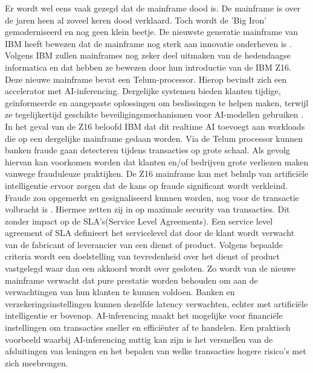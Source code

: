 Er wordt wel eens vaak gezegd dat de mainframe dood is. De mainframe is over de jaren heen al zoveel keren dood verklaard. Toch wordt de 'Big Iron' gemoderniseerd en nog geen klein beetje. De nieuwste generatie mainframe van IBM heeft bewezen dat de mainframe nog sterk aan innovatie onderheven is \autocite{Almekinders2022}. Volgens IBM zullen mainframes nog zeker deel uitmaken van de hedendaagse informatica en dat hebben ze bewezen door hun introductie van de IBM Z16. Deze nieuwe mainframe bevat een Telum-processor. Hierop bevindt zich een accelerator met AI-inferencing. Dergelijke systemen bieden klanten tijdige, geïnformeerde en aangepaste oplossingen om beslissingen te helpen maken, terwijl ze tegelijkertijd geschikte beveiligingsmechanismen voor AI-modellen gebruiken \autocite{Cammarota2020}. In het geval van de Z16 beloofd IBM dat dit realtime AI toevoegt aan workloads die op een dergelijke mainframe gedaan worden. Via de Telum processor kunnen banken fraude gaan detecteren tijdens transacties op grote schaal. Als gevolg hiervan kan voorkomen worden dat klanten en/of bedrijven grote verliezen maken vanwege frauduleuze praktijken. De Z16 mainframe kan met behulp van artificiële intelligentie ervoor zorgen dat de kans op fraude significant wordt verkleind. Fraude zou opgemerkt en gesignaliseerd kunnen worden, nog voor de transactie volbracht is \autocite{Saran2022}. Hiermee zetten zij in op maximale security van transacties. Dit zonder impact op de SLA's(Service Level Agreements). Een service level agreement of SLA definieert het servicelevel dat door de klant wordt verwacht van de fabricant of leverancier van een dienst of product. Volgens bepaalde criteria wordt een doelstelling van tevredenheid over het dienst of product vastgelegd waar dan een akkoord wordt over gesloten. Zo wordt van de nieuwe mainframe verwacht dat pure prestatie worden behouden om aan de verwachtingen van hun klanten te kunnen voldoen. Banken en verzekeringsinstellingen kunnen dezelfde latency verwachten, echter met artificiële intelligentie er bovenop. AI-inferencing maakt het mogelijke voor financiële instellingen om transacties sneller en efficiënter af te handelen. Een praktisch voorbeeld waarbij AI-inferencing nuttig kan zijn is het versnellen van de afsluitingen van leningen en het bepalen van welke transacties hogere risico's met zich meebrengen.


\subsection{}
\label{sec:Quantum computing en IBM Z16}

